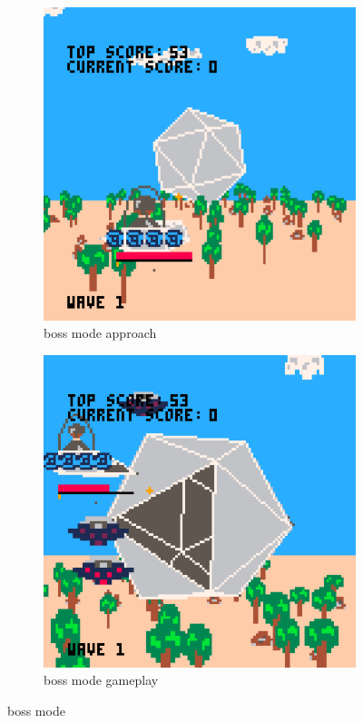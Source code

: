 \documentclass[11pt]{article}
\begin{document}
\begin{figure}[h]
\begin{subfigure}{.5\textwidth}
  \centering
  \includegraphics[width=.8\linewidth]{boss1}
  \caption{boss mode approach}
  \label{fig:bossfig1}
\end{subfigure}\hfill
\begin{subfigure}{.5\textwidth}
  \centering
  \includegraphics[width=.8\linewidth]{boss_gameplay}
  \caption{boss mode gameplay}
  \label{fig:bossfig2}
\end{subfigure}\hfill
\caption{boss mode}
\label{fig:boss}
\end{figure}
\end{document}
